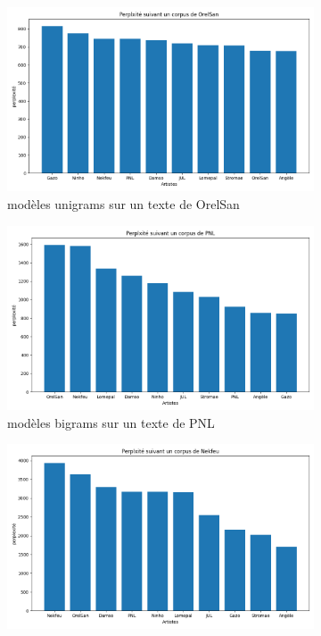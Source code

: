 \documentclass[a4paper]{article}
\begin{document}
\begin{figure}[!ht]
    \begin{subfigure}{0.32\textwidth}
        \centering
        \includegraphics[width=\linewidth]{../results/genius_results/OrelSan_1.png}
        \caption{modèles unigrams sur un texte de OrelSan}
    \end{subfigure}
    \hfill
    \begin{subfigure}{0.32\textwidth}
        \centering
        \includegraphics[width=\linewidth]{../results/genius_results/PNL_2.png}
        \caption{modèles bigrams sur un texte de PNL}
    \end{subfigure}
    \hfill
    \begin{subfigure}{0.32\textwidth}
        \centering
        \includegraphics[width=\linewidth]{../results/genius_results/Nekfeu_3.png}

\end{subfigure}
\end{figure}
\end{document}
